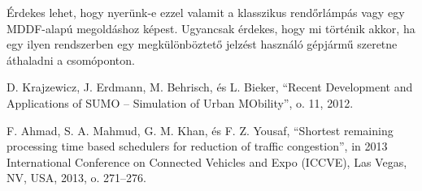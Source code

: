 \documentclass{article}
\begin{document}
				Érdekes lehet, hogy nyerünk-e ezzel valamit a klasszikus rendőrlámpás vagy egy MDDF-alapú megoldáshoz képest. Ugyancsak érdekes, hogy mi történik akkor, ha egy ilyen rendszerben egy megkülönböztető jelzést használó gépjármű szeretne áthaladni a csomóponton.
				
	\begin{thebibliography}{9}
		 D. Krajzewicz, J. Erdmann, M. Behrisch, és L. Bieker, ``Recent Development and Applications of SUMO – Simulation of Urban MObility'', o. 11, 2012.
		
		 F. Ahmad, S. A. Mahmud, G. M. Khan, és F. Z. Yousaf, ``Shortest remaining processing time based schedulers for reduction of traffic congestion'', in 2013 International Conference on Connected Vehicles and Expo (ICCVE), Las Vegas, NV, USA, 2013, o. 271–276.
		
	\end{thebibliography}
\end{document}

